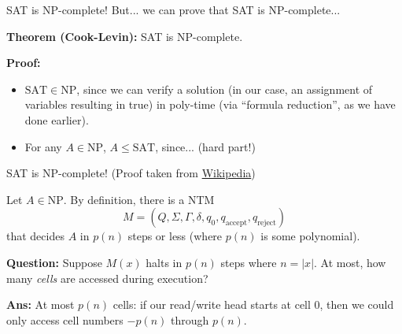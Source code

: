 \documentclass{beamer}
\begin{document}
\begin{frame}{SAT is NP-complete!}
But... we can prove that SAT is NP-complete...

\pause \vspace{2mm}

\textbf{Theorem (Cook-Levin):} SAT is NP-complete.

\pause \vspace{2mm}

\textbf{Proof:}
\begin{itemize}
    \item $\mathrm{SAT} \in \mathrm{NP}$, since we can verify a solution (in our case, an assignment of variables resulting in true) in poly-time (via ``formula reduction'', as we have done earlier).
    \item For any $A \in \mathrm{NP}$, $A \leq \mathrm{SAT}$, since... (hard part!)
\end{itemize}

\end{frame}

\begin{frame}{SAT is NP-complete!}
(Proof taken from {\color{blue} \href{https://en.wikipedia.org/wiki/Cook–Levin_theorem}{Wikipedia}})

Let $A \in \mathrm{NP}$. By definition, there is a NTM
$$M = (Q, \Sigma, \Gamma, \delta, q_0, q_{\text{accept}}, q_{\text{reject}})$$
that decides $A$ in $p(n)$ steps or less (where $p(n)$ is some polynomial).

\pause \vspace{2mm}

\textbf{Question:} Suppose $M(x)$ halts in $p(n)$ steps where $n = |x|$. At most, how many \textit{cells} are accessed during execution?

\pause 

\textbf{Ans:} At most $p(n)$ cells: if our read/write head starts at cell 0, then we could only access cell numbers $-p(n)$ through $p(n)$.

\end{frame}
\end{document}
